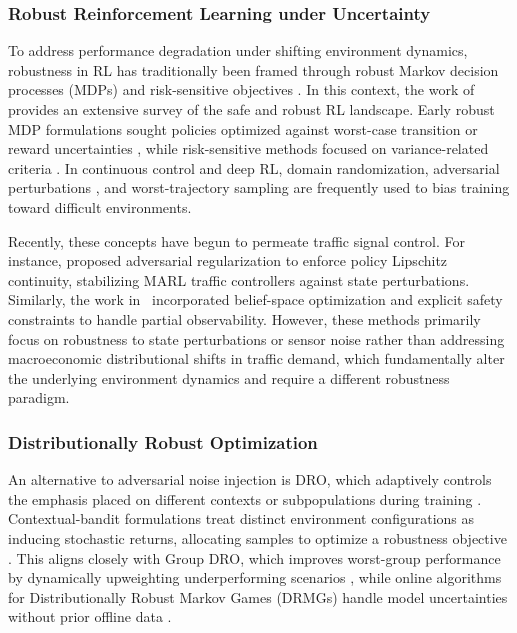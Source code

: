 \documentclass[lettersize,journal]{IEEEtran}
\begin{document}
\subsubsection{Robust Reinforcement Learning under Uncertainty}
To address performance degradation under shifting environment dynamics, robustness in RL has traditionally been framed through robust Markov decision processes (MDPs) and risk-sensitive objectives \cite{Zhang2020}. In this context, the work of \cite{yamagata2024safe} provides an extensive survey of the safe and robust RL landscape. Early robust MDP formulations sought policies optimized against worst-case transition or reward uncertainties \cite{iyengar2005robust,nilim2005robust}, while risk-sensitive methods focused on variance-related criteria \cite{tamar2015cvar}. In continuous control and deep RL, domain randomization, adversarial perturbations \cite{pinto2017rarl}, and worst-trajectory sampling \cite{rajeswaran2017epopt} are frequently used to bias training toward difficult environments.

Recently, these concepts have begun to permeate traffic signal control. For instance, \cite{bukharin2023robust} proposed adversarial regularization to enforce policy Lipschitz continuity, stabilizing MARL traffic controllers against state perturbations. Similarly, the work in~\cite{bodagala2026uncertainty} incorporated belief-space optimization and explicit safety constraints to handle partial observability. However, these methods primarily focus on robustness to state perturbations or sensor noise rather than addressing macroeconomic distributional shifts in traffic demand, which fundamentally alter the underlying environment dynamics and require a different robustness paradigm.

\subsubsection{Distributionally Robust Optimization}
An alternative to adversarial noise injection is DRO, which adaptively controls the emphasis placed on different contexts or subpopulations during training \cite{kuhn2025distributionally}. Contextual-bandit formulations treat distinct environment configurations as inducing stochastic returns, allocating samples to optimize a robustness objective \cite{langford2008epochgreedy,dudik2011doubly,agarwal2014taming}. This aligns closely with Group DRO, which improves worst-group performance by dynamically upweighting underperforming scenarios \cite{sagawa2020gdro,hashimoto2018fairness}, while online algorithms for Distributionally Robust Markov Games (DRMGs) handle model uncertainties without prior offline data \cite{farhatsample}.
\end{document}
